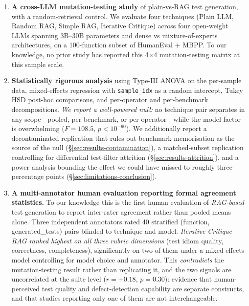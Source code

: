 \documentclass[smallextended]{svjour3}
\begin{document}
\begin{enumerate}
\item \textbf{A cross-LLM mutation-testing study} of
 plain-vs-RAG test generation, with a random-retrieval control. We evaluate four techniques (Plain LLM,
 Random RAG, Simple RAG, Iterative Critique) across four
 open-weight LLMs spanning 3B--30B parameters and dense vs
 mixture-of-experts architectures, on a 100-function subset of HumanEval + MBPP. To our knowledge, no prior study has reported
 this 4$\times$4 mutation-testing matrix at this sample scale.

\item \textbf{Statistically rigorous analysis} using Type-III ANOVA
 on the per-sample data, mixed-effects regression with
 \texttt{sample\_idx} as a random intercept, Tukey HSD post-hoc
 comparisons, and per-operator and per-benchmark decompositions.
 \emph{We report a well-powered null:} no technique pair separates in
 any scope---pooled, per-benchmark, or per-operator---while the
 model factor is overwhelming ($F = 108.5$, $p < 10^{-60}$). We
 additionally report a decontaminated replication that rules out
 benchmark memorisation as the source of the null
 (\S\ref{sec:results-contamination}), a matched-subset replication
 controlling for differential test-filter attrition
 (\S\ref{sec:results-attrition}), and a power analysis bounding the
 effect we could have missed to roughly three percentage points
 (\S\ref{sec:limitations-conclusion}).

\item \textbf{A multi-annotator human evaluation reporting formal
 agreement statistics.} To our knowledge this is the first human
 evaluation of \emph{RAG-based} test generation to report
 inter-rater agreement rather than pooled means alone. Three
 independent annotators rated 40 stratified
 (function, generated\_tests) pairs blinded to technique and model.
 \emph{Iterative Critique RAG ranked highest on all three rubric
 dimensions} (test idiom quality, correctness, completeness),
 significantly on two of them under a mixed-effects model
 controlling for model choice and annotator. This
 \emph{contradicts} the mutation-testing result rather than
 replicating it, and the two
 signals are uncorrelated at the suite level ($r = +0.18$,
 $p = 0.30$): evidence that human-perceived test quality and
 defect-detection capability are separate constructs, and that
 studies reporting only one of them are not interchangeable.


\end{enumerate}
\end{document}
